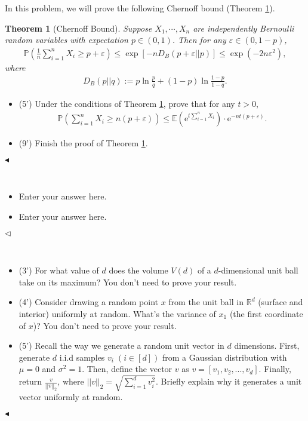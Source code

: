 \documentclass[11pt]{article}
\newtheorem{theorem}{Theorem}
\newenvironment{problem}[2][Problem]{\begin{trivlist}
\item[\hskip \labelsep {\bfseries #1}\hskip \labelsep {\bfseries #2.}]}{\hfill$\blacktriangleleft$\end{trivlist}}
\newenvironment{answer}[1][Answer]{\begin{trivlist}
\item[\hskip \labelsep {\bfseries #1.}\hskip \labelsep]}{\hfill$\lhd$\end{trivlist}}
\begin{document}
\begin{problem}{4 (14')}
In this problem, we will prove the following Chernoff bound (Theorem \ref*{thm:chernoff}).
\begin{theorem}[Chernoff Bound]
\label{thm:chernoff}
    Suppose $X_1,\cdots,X_n$ are independently Bernoulli random variables with expectation $p\in(0,1)$. Then for any $\varepsilon\in(0,1-p)$,
    \begin{align*}
        \mathbb{P}\left(\frac{1}{n}\sum_{i=1}^n X_i\geq p+\varepsilon\right)\leq \exp\left[-nD_B(p+\varepsilon||p)\right] \leq \exp(-2n\varepsilon^2),
    \end{align*} 
where 
\begin{align*}
    D_B(p||q):=p\ln\frac{p}{q}+(1-p)\ln\frac{1-p}{1-q}.
\end{align*}
\end{theorem}
\begin{itemize}
    \item [(1)] (5') Under the conditions of Theorem \ref*{thm:chernoff}, prove that for any $t>0$,
    \begin{align*}
        \mathbb{P}\left(\sum_{i=1}^n X_i\geq n(p+\varepsilon)\right)\leq\mathbb{E}\left(\mathrm{e}^{t\sum_{i=1}^n X_i}\right)\cdot\mathrm{e}^{-nt(p+\varepsilon)}.
    \end{align*}
    \item [(2)] (9') Finish the proof of Theorem \ref*{thm:chernoff}.
\end{itemize}
\end{problem}

\begin{answer} ~
\begin{itemize}
    \item [(1)] Enter your answer here.
    \item [(2)] Enter your answer here.
\end{itemize}
\end{answer}



\begin{problem}{5 (12')} ~
\begin{itemize}
    \item [(1)] (3') For what value of $d$ does the volume $V(d)$ of a $d$-dimensional unit ball take on its maximum? You don't need to prove your result.
    \item [(2)] (4') Consider drawing a random point $x$ from the unit ball in $\mathbb{R}^d$ (surface and interior) uniformly at random. What's the variance of $x_1$ (the first coordinate of $x$)? You don't need to prove your result.
    \item [(3)] (5') Recall the way we generate a random unit vector in $d$ dimensions. First, generate $d$ i.i.d samples $v_i\;(i\in [d])$ from a Gaussian distribution with $\mu=0$ and $\sigma^2=1$. Then, define the vector $v$ as $v=[v_1,v_2,...,v_d]$. Finally, return $\frac{v}{||v||_2}$, where $||v||_2=\sqrt{\sum_{i=1}^d v_i^2}$. Briefly explain why it generates a unit vector uniformly at random.
\end{itemize}
\end{problem}
\end{document}
